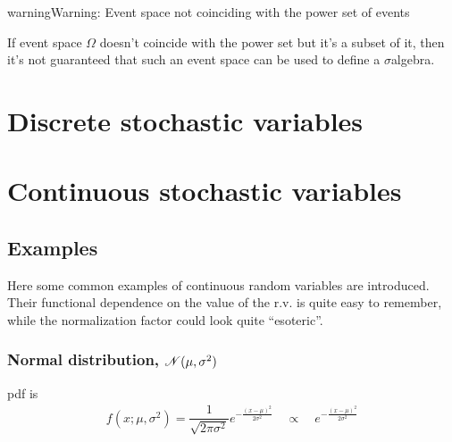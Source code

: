 \documentclass[letterpaper,10pt,english]{jupyterBook}
\begin{document}
\begin{sphinxadmonition}{warning}{Warning:}
\sphinxAtStartPar
Event space not coinciding with the power set of events

\sphinxAtStartPar
If event space \(\Omega\) doesn’t coincide with the power set but it’s a subset of it, then it’s not guaranteed that such an event space can be used to define a \(\sigma\)\sphinxhyphen{}algebra.
\end{sphinxadmonition}

\sphinxstepscope


\section{Discrete stochastic variables}
\label{\detokenize{ch/prob/rv-discrete:discrete-stochastic-variables}}\label{\detokenize{ch/prob/rv-discrete:prob-rv-discrete}}\label{\detokenize{ch/prob/rv-discrete::doc}}
\sphinxstepscope


\section{Continuous stochastic variables}
\label{\detokenize{ch/prob/rv-continuous:continuous-stochastic-variables}}\label{\detokenize{ch/prob/rv-continuous:prob-rv-continuous}}\label{\detokenize{ch/prob/rv-continuous::doc}}

\subsection{Examples}
\label{\detokenize{ch/prob/rv-continuous:examples}}\label{\detokenize{ch/prob/rv-continuous:prob-rv-continuous-ex}}
\sphinxAtStartPar
Here some common examples of continuous random variables are introduced. Their functional dependence on the value of the r.v. is quite easy to remember, while the normalization factor could look quite “esoteric”.


\subsubsection{Normal distribution, \protect\(\mathscr{N}(\mu, \sigma^2)\protect\)}
\label{\detokenize{ch/prob/rv-continuous:normal-distribution-mathscr-n-mu-sigma-2}}\label{\detokenize{ch/prob/rv-continuous:prob-rv-continuous-ex-normal}}
\sphinxAtStartPar
pdf is
\begin{equation*}
\begin{split}f(x; \mu, \sigma^2) = \dfrac{1}{\sqrt{2 \pi \sigma^2}}  e^{-\frac{(x-\mu)^2}{2 \sigma^2}}  \quad \propto \quad e^{- \frac{(x-\mu)^2}{2 \sigma^2}}\end{split}
\end{equation*}
\end{document}
